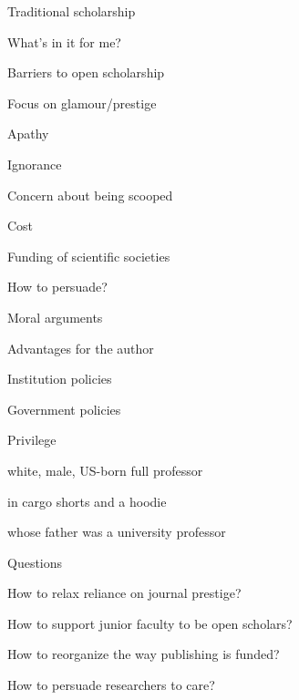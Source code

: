 \documentclass[aspectratio=169,12pt,t]{beamer}
\begin{document}
\begin{frame}[c]{Traditional scholarship}

  \Large
  \centering

  What's in it for me?


  \note{
  }
\end{frame}





\begin{frame}{Barriers to open scholarship}

  \bbi
\item Focus on glamour/prestige
\item Apathy
\item Ignorance
\item Concern about being scooped
\item Cost
\item Funding of scientific societies
  \ei

  \note{
  }
\end{frame}



\begin{frame}{How to persuade?}

  \bbi
\item Moral arguments
\item Advantages for the author
\item Institution policies
\item Government policies
  \ei

\end{frame}






\begin{frame}[c]{Privilege}

  \centering \Large
  white, male, US-born full professor

  in cargo shorts and a hoodie

  whose father was a university professor




\end{frame}


\begin{frame}{Questions}

  \bbi
\item How to relax reliance on journal prestige?
\item How to support junior faculty to be open scholars?
\item How to reorganize the way publishing is funded?
\item How to persuade researchers to care?
  \ei

  \note{
  }
\end{frame}
\end{document}
